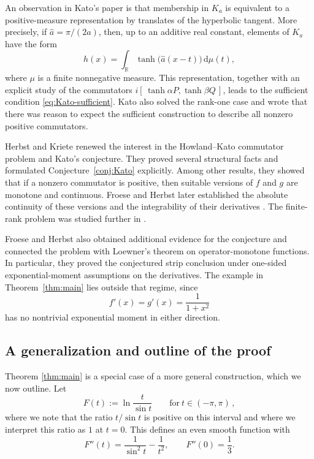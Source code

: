 \documentclass[10pt,a4paper]{amsart}
\newcommand{\R}{\mathbb{R}}
\newcommand{\dd}{\,\mathrm{d}}
\begin{document}
An observation in Kato's paper is that membership in $K_a$ is equivalent to a positive-measure representation by translates of the hyperbolic tangent.  More precisely, if $\widehat a=\pi/(2a)$, then, up to an additive real constant, elements of $K_a$ have the form
\begin{equation}\label{eq:Kato-representation}
h(x)=\int_{\R}\tanh\bigl(\widehat a(x-t)\bigr)\dd\mu(t),
\end{equation}
where $\mu$ is a finite nonnegative measure.  This representation, together with an explicit study of the commutators $i[\,\tanh\alpha P,\tanh\beta Q\,]$, leads to the sufficient condition \eqref{eq:Kato-sufficient}.  Kato also solved the rank-one case and wrote that there was reason to expect the sufficient construction to describe all nonzero positive commutators.

Herbst and Kriete \cite{HerbstKriete} renewed the interest in the Howland--Kato commutator problem and Kato's conjecture. They proved several structural facts and formulated Conjecture~\ref{conj:Kato} explicitly.  Among other results, they showed that if a nonzero commutator is positive, then suitable versions of $f$ and $g$ are monotone and continuous. Froese and Herbst later established the absolute continuity of these versions and the integrability of their derivatives \cite[Theorem~1.1]{FroeseHerbst}.  The finite-rank problem was studied further in \cite{HerbstFiniteRank}.

Froese and Herbst \cite{FroeseHerbst} also obtained additional evidence for the conjecture and connected the problem with Loewner's theorem on operator-monotone functions.  In particular, they proved the conjectured strip conclusion under one-sided exponential-moment assumptions on the derivatives.  The example in Theorem~\ref{thm:main} lies outside that regime, since
\[
f'(x)=g'(x)=\frac{1}{1+x^2}
\]
has no nontrivial exponential moment in either direction.


\subsection*{A generalization and outline of the proof}

Theorem \ref{thm:main} is a special case of a more general construction, which we now outline. Let
\begin{equation}\label{eq:F-def}
F(t):=\ln\frac{t}{\sin t}
\qquad\text{for}\ t\in(-\pi,\pi) \,,
\end{equation}
where we note that the ratio $t/\sin t$ is positive on this interval and where we interpret this ratio as $1$ at $t=0$. This defines an even smooth function with
\begin{equation}\label{eq:Fpp}
F''(t)=\frac{1}{\sin^2t}-\frac{1}{t^2},
\qquad
F''(0)=\frac13.
\end{equation}
\end{document}
